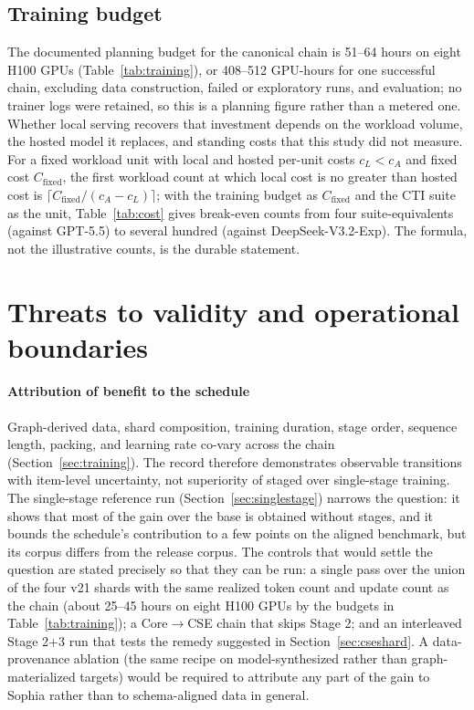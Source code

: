\documentclass[twocolumn]{svjour3}
\begin{document}
\subsection{Training budget}
The documented planning budget for the canonical chain is 51--64 hours on eight H100 GPUs (Table~\ref{tab:training}), or 408--512 GPU-hours for one successful chain, excluding data construction, failed or exploratory runs, and evaluation; no trainer logs were retained, so this is a planning figure rather than a metered one. Whether local serving recovers that investment depends on the workload volume, the hosted model it replaces, and standing costs that this study did not measure. For a fixed workload unit with local and hosted per-unit costs $c_L<c_A$ and fixed cost $C_{\mathrm{fixed}}$, the first workload count at which local cost is no greater than hosted cost is $\lceil C_{\mathrm{fixed}}/(c_A-c_L)\rceil$; with the training budget as $C_{\mathrm{fixed}}$ and the CTI suite as the unit, Table~\ref{tab:cost} gives break-even counts from four suite-equivalents (against GPT-5.5) to several hundred (against DeepSeek-V3.2-Exp). The formula, not the illustrative counts, is the durable statement.

\section{Threats to validity and operational boundaries}\label{sec:limits}
\paragraph{Attribution of benefit to the schedule}
Graph-derived data, shard composition, training duration, stage order, sequence length, packing, and learning rate co-vary across the chain (Section~\ref{sec:training}). The record therefore demonstrates observable transitions with item-level uncertainty, not superiority of staged over single-stage training. The single-stage reference run (Section~\ref{sec:singlestage}) narrows the question: it shows that most of the gain over the base is obtained without stages, and it bounds the schedule's contribution to a few points on the aligned benchmark, but its corpus differs from the release corpus. The controls that would settle the question are stated precisely so that they can be run: a single pass over the union of the four v21 shards with the same realized token count and update count as the chain (about 25--45 hours on eight H100 GPUs by the budgets in Table~\ref{tab:training}); a Core$\rightarrow$CSE chain that skips Stage 2; and an interleaved Stage 2+3 run that tests the remedy suggested in Section~\ref{sec:cseshard}. A data-provenance ablation (the same recipe on model-synthesized rather than graph-materialized targets) would be required to attribute any part of the gain to Sophia rather than to schema-aligned data in general.
\end{document}
